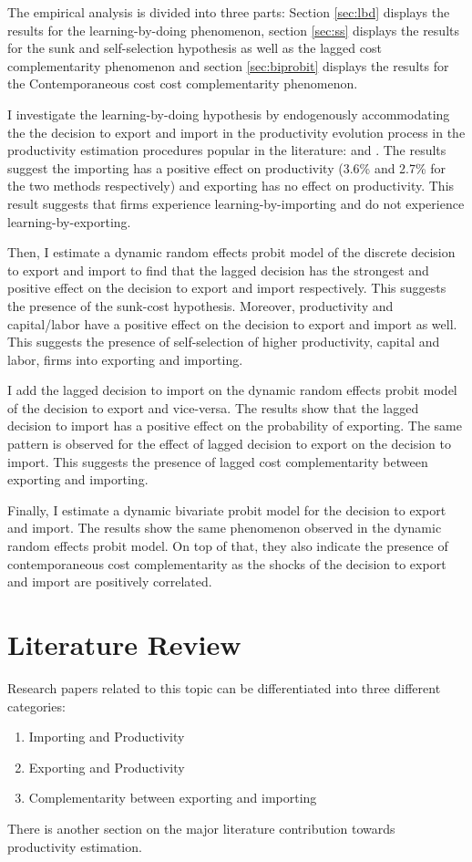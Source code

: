 \documentclass[12pt]{article}
\begin{document}
The empirical analysis is divided into three parts: Section
\ref{sec:lbd} displays the results for the learning-by-doing
phenomenon, section \ref{sec:ss} displays the results for the sunk and
self-selection hypothesis as well as the lagged cost complementarity
phenomenon and section \ref{sec:biprobit} displays the results for the
Contemporaneous cost cost complementarity phenomenon.

  I investigate the learning-by-doing hypothesis by endogenously
accommodating the the decision to export and import in the
productivity evolution process in the productivity estimation
procedures popular in the literature:
\textcite{levinsohn2003estimating} and
\textcite{ackerberg2006structural}. The results suggest the importing
has a positive effect on productivity (3.6\% and 2.7\% for the two
methods respectively) and exporting has no effect on
productivity. This result suggests that firms experience
learning-by-importing and do not experience learning-by-exporting. 

Then, I estimate a dynamic random effects probit model of the discrete
decision to export and import to find that the lagged decision has the
strongest and positive effect on the decision to export and
import respectively. This suggests the presence of the sunk-cost
hypothesis. Moreover, productivity and capital/labor have a positive
effect on the decision to export and import as well. This suggests the
presence of self-selection of higher productivity, capital and labor,  firms into exporting
and importing. 

I add the lagged decision to import on the dynamic random effects
probit model  of the decision to export and vice-versa. The results show that the lagged
decision to import has a positive effect on the probability of
exporting. The same pattern is observed for the effect of lagged
decision to export on the decision to import. This suggests the
presence of lagged cost complementarity between exporting and
importing. 

 Finally, I estimate a dynamic bivariate probit model for the decision to export
and import. The results show the same phenomenon observed in the
dynamic random effects probit model. On top of that, they also indicate the presence
of contemporaneous cost complementarity as the shocks of the decision
to export and import are positively correlated. 

\section{Literature Review}\label{sec:lit}
Research papers related to this topic can be differentiated into three different
categories:
\begin{enumerate}
\item Importing and Productivity 
\item Exporting and Productivity
\item  Complementarity between exporting and importing
\end{enumerate}
There is another section on the major literature contribution towards
productivity estimation. 
\end{document}
